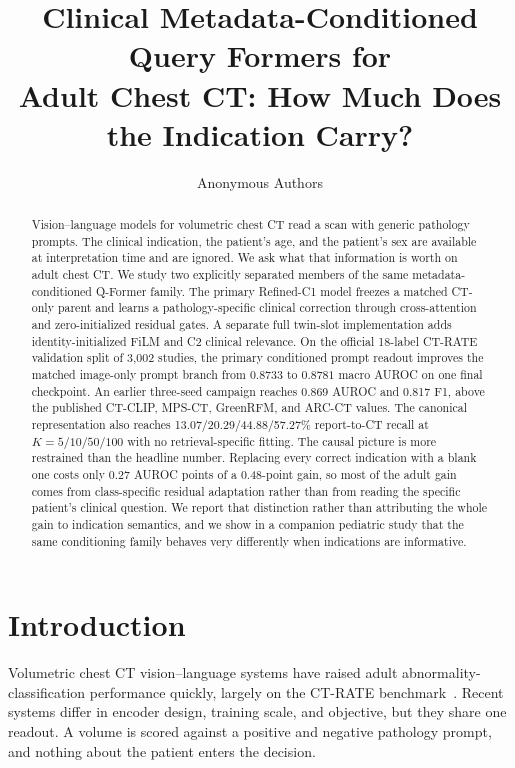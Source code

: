 \documentclass[10pt,twocolumn]{article}
\title{Clinical Metadata-Conditioned Query Formers for\\
Adult Chest CT: How Much Does the Indication Carry?}
\author{Anonymous Authors}
\date{}
\begin{document}
\maketitle

\begin{abstract}
Vision--language models for volumetric chest CT read a scan with generic
pathology prompts. The clinical indication, the patient's age, and the
patient's sex are available at interpretation time and are ignored. We ask
what that information is worth on adult chest CT. We study two explicitly
separated members of the same metadata-conditioned Q-Former family. The
primary Refined-C1 model freezes a matched CT-only parent and learns a
pathology-specific clinical correction through cross-attention and
zero-initialized residual gates. A separate full twin-slot implementation adds
identity-initialized FiLM and C2 clinical relevance. On the official 18-label
CT-RATE validation split of 3,002 studies, the primary conditioned prompt
readout improves the matched image-only prompt branch from $0.8733$ to
$0.8781$ macro AUROC on one final checkpoint. An earlier three-seed campaign
reaches 0.869 AUROC and 0.817 F1, above the
published CT-CLIP, MPS-CT, GreenRFM, and ARC-CT values. The canonical
representation also reaches 13.07/20.29/44.88/57.27\% report-to-CT
recall at $K=5/10/50/100$ with no retrieval-specific fitting. The causal
picture is more restrained than the headline number. Replacing every correct
indication with a blank one costs only 0.27 AUROC points of a 0.48-point gain,
so most of the adult gain comes from class-specific residual adaptation rather
than from reading the specific patient's clinical question. We report that
distinction rather than attributing the whole gain to indication semantics,
and we show in a companion pediatric study that the same conditioning family behaves
very differently when indications are informative.
\end{abstract}

\section{Introduction}
Volumetric chest CT vision--language systems have raised adult
abnormality-classification performance quickly, largely on the CT-RATE
benchmark~\cite{hamamci2024ctclip}. Recent systems differ in encoder design,
training scale, and objective, but they share one readout. A volume is scored
against a positive and negative pathology prompt, and nothing about the
patient enters the decision.
\end{document}

